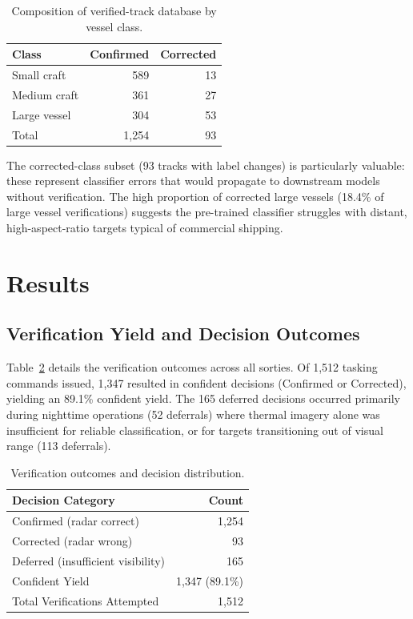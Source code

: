 \documentclass[conf]{asmeconf}
\begin{document}
\begin{table}[t]
\caption{Composition of verified-track database by vessel class.}
\label{tab:composition}
\centering
\begin{tabular}{@{}lrr@{}}
\toprule
Class & Confirmed & Corrected \\
\midrule
Small craft & 589 & 13 \\
Medium craft & 361 & 27 \\
Large vessel & 304 & 53 \\
\bottomrule
Total & 1,254 & 93 \\
\end{tabular}
\end{table}

The corrected-class subset (93 tracks with label changes) is particularly valuable: these represent classifier errors that would propagate to downstream models without verification. The high proportion of corrected large vessels (18.4\% of large vessel verifications) suggests the pre-trained classifier struggles with distant, high-aspect-ratio targets typical of commercial shipping.

\section{Results}

\subsection{Verification Yield and Decision Outcomes}

Table~\ref{tab:verification} details the verification outcomes across all sorties. Of 1,512 tasking commands issued, 1,347 resulted in confident decisions (Confirmed or Corrected), yielding an 89.1\% confident yield. The 165 deferred decisions occurred primarily during nighttime operations (52 deferrals) where thermal imagery alone was insufficient for reliable classification, or for targets transitioning out of visual range (113 deferrals).

\begin{table}[t]
\caption{Verification outcomes and decision distribution.}
\label{tab:verification}
\centering
\begin{tabular}{@{}lr@{}}
\toprule
Decision Category & Count \\
\midrule
Confirmed (radar correct) & 1,254 \\
Corrected (radar wrong) & 93 \\
Deferred (insufficient visibility) & 165 \\
\midrule
Confident Yield & 1,347 (89.1\%) \\
Total Verifications Attempted & 1,512 \\
\bottomrule
\end{tabular}
\end{table}
\end{document}
